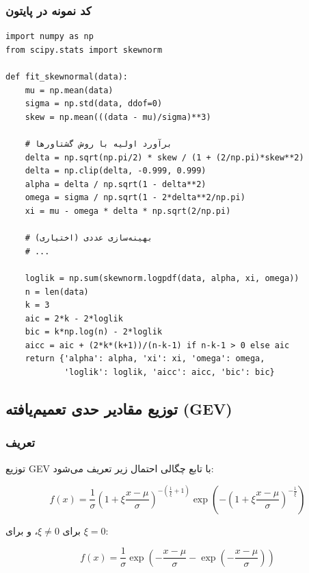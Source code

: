 \documentclass[a4paper,12pt]{article}
\begin{document}
\subsubsection{کد نمونه در پایتون}

\begin{verbatim}
import numpy as np
from scipy.stats import skewnorm

def fit_skewnormal(data):
    mu = np.mean(data)
    sigma = np.std(data, ddof=0)
    skew = np.mean(((data - mu)/sigma)**3)
    
    # برآورد اولیه با روش گشتاورها
    delta = np.sqrt(np.pi/2) * skew / (1 + (2/np.pi)*skew**2)
    delta = np.clip(delta, -0.999, 0.999)
    alpha = delta / np.sqrt(1 - delta**2)
    omega = sigma / np.sqrt(1 - 2*delta**2/np.pi)
    xi = mu - omega * delta * np.sqrt(2/np.pi)
    
    # بهینه‌سازی عددی (اختیاری)
    # ...
    
    loglik = np.sum(skewnorm.logpdf(data, alpha, xi, omega))
    n = len(data)
    k = 3
    aic = 2*k - 2*loglik
    bic = k*np.log(n) - 2*loglik
    aicc = aic + (2*k*(k+1))/(n-k-1) if n-k-1 > 0 else aic
    return {'alpha': alpha, 'xi': xi, 'omega': omega, 
            'loglik': loglik, 'aicc': aicc, 'bic': bic}
\end{verbatim}

\subsection{توزیع مقادیر حدی تعمیم‌یافته (GEV)}

\subsubsection{تعریف}

توزیع GEV با تابع چگالی احتمال زیر تعریف می‌شود:

\begin{equation}
f(x) = \frac{1}{\sigma} \left(1 + \xi\frac{x-\mu}{\sigma}\right)^{-\left(\frac{1}{\xi}+1\right)} \exp\left(-\left(1 + \xi\frac{x-\mu}{\sigma}\right)^{-\frac{1}{\xi}}\right)
\end{equation}

برای $\xi \neq 0$، و برای $\xi = 0$:

\begin{equation}
f(x) = \frac{1}{\sigma} \exp\left(-\frac{x-\mu}{\sigma} - \exp\left(-\frac{x-\mu}{\sigma}\right)\right)
\end{equation}
\end{document}
